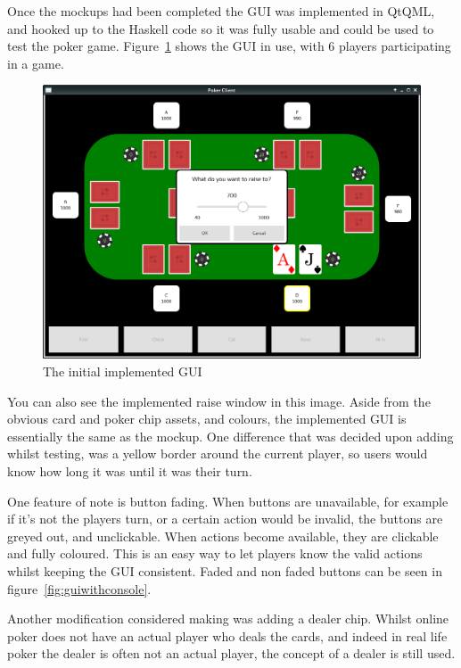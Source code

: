 Once the mockups had been completed the GUI was implemented in QtQML,
and hooked up to the Haskell code so it was fully usable and could be used
to test the poker game. Figure~\ref{fig:actualgui} shows the GUI in use,
with 6 players participating in a game. 

\begin{figure}[H]
    \centering
    \includegraphics[width=\textwidth]{../images/actualgui.png}
    \caption{The initial implemented GUI}%
    \label{fig:actualgui}
\end{figure}

You can also see the implemented raise window in this image. Aside from the 
obvious card and poker chip assets, and colours, the implemented GUI is 
essentially the same as the mockup. One difference that was decided upon 
adding whilst testing, was a yellow border around the current player, so users 
would know how long it was until it was their turn. 

One feature of note is button fading. When buttons are unavailable, for
example if it's not the players turn, or a certain action would be invalid,
the buttons are greyed out, and unclickable. When actions become available,
they are clickable and fully coloured. This is an easy way to let players
know the valid actions whilst keeping the GUI consistent. Faded and non faded
buttons can be seen in figure~\ref{fig:guiwithconsole}.

Another modification considered making was adding a dealer chip. Whilst
online poker does not have an actual player who deals the cards, and indeed
in real life poker the dealer is often not an actual player, the concept of
a dealer is still used.

